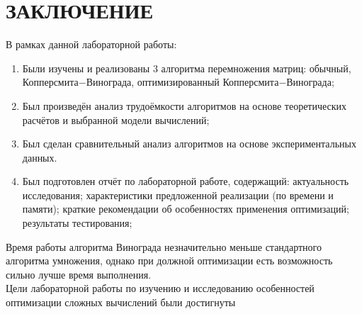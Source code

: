\chapter*{ЗАКЛЮЧЕНИЕ}

В рамках данной лабораторной работы:

\begin{enumerate}
    \item Были изучены и реализованы 3 алгоритма перемножения матриц: обычный, Копперсмита$-$Винограда, оптимизированный Копперсмита$-$Винограда;
    \item Был произведён анализ трудоёмкости алгоритмов на основе теоретических расчётов и выбранной модели вычислений;
    \item Был сделан сравнительный анализ алгоритмов на основе экспериментальных данных.
    \item Был подготовлен отчёт по лабораторной работе, содержащий: актуальность исследования; характеристики предложенной реализации (по времени и памяти);
    краткие рекомендации об особенностях применения оптимизаций;
    результаты тестирования;
\end{enumerate}
Время работы алгоритма Винограда незначительно меньше стандартного алгоритма умножения, однако при должной оптимизации есть возможность сильно лучше время выполнения.
\\
Цели лабораторной работы по изучению и исследованию особенностей оптимизации сложных вычислений были достигнуты